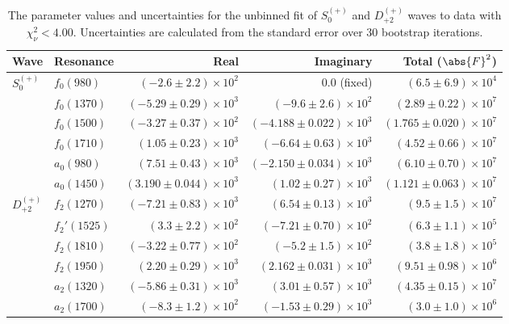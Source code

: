 \begin{table}[ht]
    \begin{center}
        \begin{tabular}{llrrr}\toprule
        Wave & Resonance & Real & Imaginary & Total ($\abs{F}^2$) \\\midrule
$S_{0}^{(+)}$ & $f_{0}(980)$ & $(-2.6 \pm 2.2) \times 10^{2}$ & $0.0$ (fixed) & $(6.5 \pm 6.9) \times 10^{4}$ \\
 & $f_{0}(1370)$ & $(-5.29 \pm 0.29) \times 10^{3}$ & $(-9.6 \pm 2.6) \times 10^{2}$ & $(2.89 \pm 0.22) \times 10^{7}$ \\
 & $f_{0}(1500)$ & $(-3.27 \pm 0.37) \times 10^{2}$ & $(-4.188 \pm 0.022) \times 10^{3}$ & $(1.765 \pm 0.020) \times 10^{7}$ \\
 & $f_{0}(1710)$ & $(1.05 \pm 0.23) \times 10^{3}$ & $(-6.64 \pm 0.63) \times 10^{3}$ & $(4.52 \pm 0.66) \times 10^{7}$ \\
 & $a_{0}(980)$ & $(7.51 \pm 0.43) \times 10^{3}$ & $(-2.150 \pm 0.034) \times 10^{3}$ & $(6.10 \pm 0.70) \times 10^{7}$ \\
 & $a_{0}(1450)$ & $(3.190 \pm 0.044) \times 10^{3}$ & $(1.02 \pm 0.27) \times 10^{3}$ & $(1.121 \pm 0.063) \times 10^{7}$ \\
$D_{+2}^{(+)}$ & $f_{2}(1270)$ & $(-7.21 \pm 0.83) \times 10^{3}$ & $(6.54 \pm 0.13) \times 10^{3}$ & $(9.5 \pm 1.5) \times 10^{7}$ \\
 & $f_{2}'(1525)$ & $(3.3 \pm 2.2) \times 10^{2}$ & $(-7.21 \pm 0.70) \times 10^{2}$ & $(6.3 \pm 1.1) \times 10^{5}$ \\
 & $f_{2}(1810)$ & $(-3.22 \pm 0.77) \times 10^{2}$ & $(-5.2 \pm 1.5) \times 10^{2}$ & $(3.8 \pm 1.8) \times 10^{5}$ \\
 & $f_{2}(1950)$ & $(2.20 \pm 0.29) \times 10^{3}$ & $(2.162 \pm 0.031) \times 10^{3}$ & $(9.51 \pm 0.98) \times 10^{6}$ \\
 & $a_{2}(1320)$ & $(-5.86 \pm 0.31) \times 10^{3}$ & $(3.01 \pm 0.57) \times 10^{3}$ & $(4.35 \pm 0.15) \times 10^{7}$ \\
 & $a_{2}(1700)$ & $(-8.3 \pm 1.2) \times 10^{2}$ & $(-1.53 \pm 0.29) \times 10^{3}$ & $(3.0 \pm 1.0) \times 10^{6}$ \\\bottomrule
        \end{tabular}
    \caption{The parameter values and uncertainties for the unbinned fit of $S_{0}^{(+)}$ and $D_{+2}^{(+)}$ waves to data with $\chi^2_\nu < 4.00$. Uncertainties are calculated from the standard error over $30$ bootstrap iterations.}\label{tab:unbinned-fit-chisqdof-4.0-Sp0p-Dp2p}
    \end{center}
\end{table}
